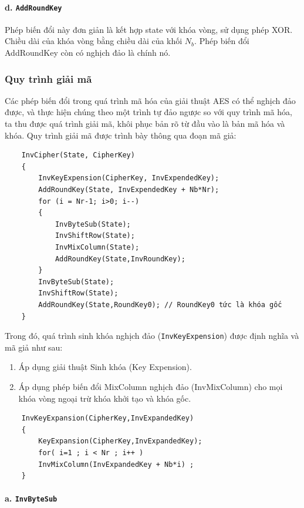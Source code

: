 \paragraph{d. \texttt{AddRoundKey}}\quad

Phép biến đổi này đơn giản là kết hợp state với khóa vòng, sử dụng phép XOR. Chiều dài của khóa vòng bằng chiều dài của khối $N_b$. Phép biến đổi AddRoundKey còn có nghịch đảo là chính nó.

\subsubsection{Quy trình giải mã}

Các phép biến đổi trong quá trình mã hóa của giải thuật AES có thể nghịch đảo được, và thực hiện chúng theo một trình tự đảo ngược so với quy trình mã hóa, ta thu được quá trình giải mã, khôi phục bản rõ từ đầu vào là bản mã hóa và khóa. Quy trình giải mã được trình bày thông qua đoạn mã giả:

\begin{BVerbatim}
	InvCipher(State, CipherKey)
	{
		InvKeyExpension(CipherKey, InvExpendedKey);
		AddRoundKey(State, InvExpendedKey + Nb*Nr);
		for (i = Nr-1; i>0; i--) 
		{
			InvByteSub(State);
			InvShiftRow(State);
			InvMixColumn(State);
			AddRoundKey(State,InvRoundKey);
		}
		InvByteSub(State);
		InvShiftRow(State);
		AddRoundKey(State,RoundKey0); // RoundKey0 tức là khóa gốc
	}
\end{BVerbatim}

Trong đó, quá trình sinh khóa nghịch đảo (\texttt{InvKeyExpension}) được định nghĩa và mã giả như sau:
\begin{enumerate}
	\item Áp dụng giải thuật Sinh khóa (Key Expension).
	\item Áp dụng phép biến đổi MixColumn nghịch đảo (InvMixColumn) cho mọi khóa vòng ngoại trừ khóa khởi tạo và khóa gốc.
\end{enumerate}
\begin{center}
\begin{BVerbatim}
	InvKeyExpansion(CipherKey,InvExpandedKey)
	{
		KeyExpansion(CipherKey,InvExpandedKey);
		for( i=1 ; i < Nr ; i++ )
		InvMixColumn(InvExpandedKey + Nb*i) ;
	}
\end{BVerbatim}
\end{center}


\paragraph{a. \texttt{InvByteSub}}\quad

